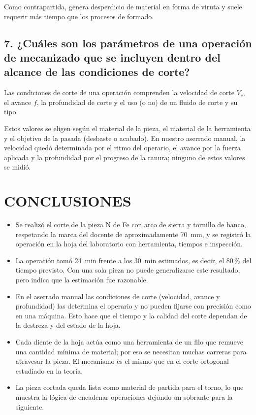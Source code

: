 \documentclass[12pt,a4paper]{article}
\begin{document}
Como contrapartida, genera desperdicio de material en forma de viruta y suele
requerir más tiempo que los procesos de formado.

\subsection*{7. ¿Cuáles son los parámetros de una operación de mecanizado que se
	incluyen dentro del alcance de las condiciones de corte?}

Las condiciones de corte de una operación comprenden la velocidad de
corte $V_c$, el avance $f$, la profundidad de corte y el uso (o no) de un fluido
de corte y su tipo.

\vspace{6pt}

Estos valores se eligen según el material de la pieza, el material de la
herramienta y el objetivo de la pasada (desbaste o acabado). En nuestro aserrado
manual, la velocidad quedó determinada por el ritmo del operario, el avance por
la fuerza aplicada y la profundidad por el progreso de la ranura; ninguno de
estos valores se midió.

\section{CONCLUSIONES}

\begin{itemize}
	\item Se realizó el corte de la pieza N de Fe con arco de sierra
	      y tornillo de banco, respetando la marca del docente de aproximadamente
	      \SI{70}{\milli\metre}, y se registró la operación en la hoja del
	      laboratorio con herramienta, tiempos e inspección.\\[-10pt]
	\item La operación tomó \SI{24}{\minute} frente a los \SI{30}{\minute}
	      estimados, es decir, el 80\,\% del tiempo previsto. Con una sola pieza
	      no puede generalizarse este resultado, pero indica que la estimación
	      fue razonable.\\[-10pt]
	\item En el aserrado manual las condiciones de corte (velocidad, avance y
	      profundidad) las determina el operario y no pueden fijarse con precisión
	      como en una máquina. Esto hace que el tiempo y la calidad del corte
	      dependan de la destreza y del estado de la hoja.\\[-10pt]
	\item Cada diente de la hoja actúa como una herramienta de un filo que remueve
	      una cantidad mínima de material; por eso se necesitan muchas carreras
	      para atravesar la pieza. El mecanismo es el mismo que en el corte
	      ortogonal estudiado en la teoría.\\[-10pt]
	\item La pieza cortada queda lista como material de partida para el torno, lo
	      que muestra la lógica de encadenar operaciones dejando un sobrante para
	      la siguiente.
\end{itemize}
\end{document}
